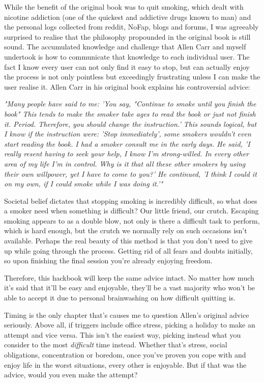 \documentclass[easypeasy.tex]{subfiles}
\begin{document}
While the benefit of the original book was to quit smoking, which dealt with nicotine addiction (one of the quickest and addictive drugs known to man) and the personal logs collected from reddit, NoFap, blogs and forums, I was agreeably surprised to realise that the philosophy propounded in the original book is still sound. The accumulated knowledge and challenge that Allen Carr and myself undertook is how to communicate that knowledge to each individual user. The fact I know every user can not only find it easy to stop, but can actually enjoy the process is not only pointless but exceedingly frustrating unless I can make the user realise it. Allen Carr in his original book explains his controversial advice:

  \textit{"Many people have said to me: 'You say, "Continue to smoke until you finish the book" This tends to make the smoker take ages to read the book or just not finish it. Period. Therefore, you should change the instruction.' This sounds logical, but I know if the instruction were: 'Stop immediately', some smokers wouldn't even start reading the book. I had a smoker consult me in the early days. He said, 'I really resent having to seek your help, I know I'm strong-willed. In every other area of my life I'm in control. Why is it that all these other smokers by using their own willpower, yet I have to come to you?' He continued, 'I think I could it on my own, if I could smoke while I was doing it.'"}

Societal belief dictates that stopping smoking is incredibly difficult, so what does a smoker need when something is difficult? Our little friend, our crutch. Escaping smoking appears to as a double blow, not only is there a difficult task to perform, which is hard enough, but the crutch we normally rely on such occasions isn't available. Perhaps the real beauty of this method is that you don't need to give up while going through the process. Getting rid of all fears and doubts initially, so upon finishing the final session you're already enjoying freedom. 

Therefore, this hackbook will keep the same advice intact. No matter how much it's said that it'll be easy and enjoyable, they'll be a vast majority who won't be able to accept it due to personal brainwashing on how difficult quitting is.

Timing is the only chapter that's causes me to question Allen's original advice seriously. Above all, if triggers include office stress, picking a holiday to make an attempt and vice versa. This isn't the easiest way, picking instead what you consider to the most \textit{difficult} time instead. Whether that's stress, social obligations, concentration or boredom, once you've proven you cope with and enjoy life in the worst situations, every other is enjoyable. But if that was the advice, would you even make the attempt?
\end{document}
